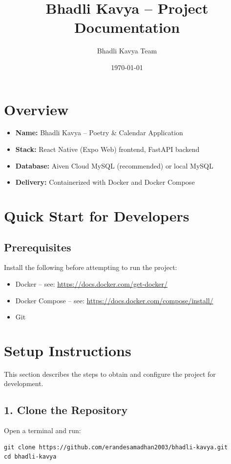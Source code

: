 \documentclass[11pt]{article}
\title{Bhadli Kavya -- Project Documentation}
\author{Bhadli Kavya Team}
\date{\today}
\begin{document}
\maketitle
\thispagestyle{empty}

\section*{Overview}
\begin{itemize}[leftmargin=*]
	\item \textbf{Name:} Bhadli Kavya -- Poetry \& Calendar Application
	\item \textbf{Stack:} React Native (Expo Web) frontend, FastAPI backend
	\item \textbf{Database:} Aiven Cloud MySQL (recommended) or local MySQL
	\item \textbf{Delivery:} Containerized with Docker and Docker Compose
\end{itemize}

\section{Quick Start for Developers}
\subsection{Prerequisites}
Install the following before attempting to run the project:
\begin{itemize}
	\item Docker -- see: \url{https://docs.docker.com/get-docker/}
	\item Docker Compose -- see: \url{https://docs.docker.com/compose/install/}
	\item Git
\end{itemize}

\section{Setup Instructions}
This section describes the steps to obtain and configure the project for development.

\subsection{1. Clone the Repository}
Open a terminal and run:
\begin{Verbatim}[fontsize=\small]
git clone https://github.com/erandesamadhan2003/bhadli-kavya.git
cd bhadli-kavya
\end{Verbatim}
\end{document}
